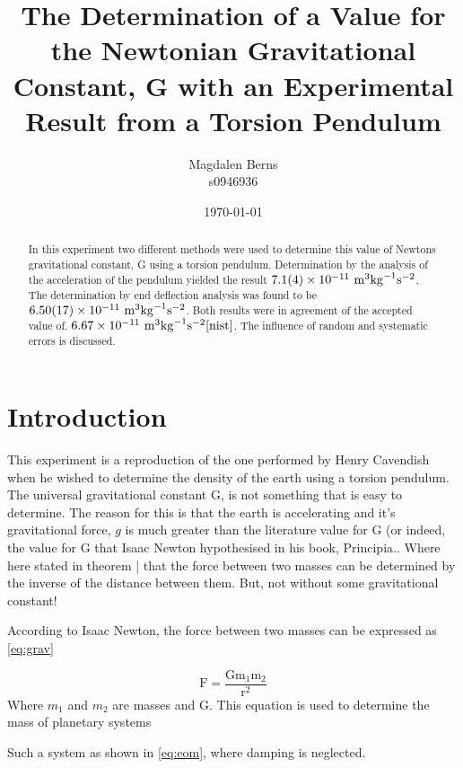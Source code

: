 \documentclass[12pt]{article}
\title{The Determination of a Value for the Newtonian Gravitational Constant, G with an Experimental Result from a Torsion Pendulum}
\author{Magdalen Berns
\\
s0946936 \\}
\date{\today}
\begin{document}
\maketitle
\thispagestyle{empty}

\begin{abstract}
\noindent
In this experiment two different methods were used to determine this value of Newtons gravitational constant, G using a torsion pendulum. Determination by the analysis of the acceleration of the pendulum yielded the result $7.1(4)\times{10^{-11}}{\rm \ m}^3 {\rm kg}^{-1} {\rm s}^{-2}$. The determination by end deflection analysis was found to be $6.50(17)\times{10^{-11}}{\rm \ m}^3 {\rm kg}^{-1} {\rm s}^{-2}$. Both  results were in agreement of the accepted value of. $6.67\times{10^{-11}}{\rm \ m}^3 {\rm kg}^{-1} {\rm s}^{-2}\cite{nist}$. The influence of random and systematic errors is discussed.

 \end{abstract}

\clearpage
\tableofcontents
\thispagestyle{empty}
\clearpage

\section{Introduction}

This experiment is a reproduction of the one performed by Henry Cavendish when he wished to determine the density of the earth using a torsion pendulum.\cite{density,densearth} The universal gravitational constant G, is not something that is easy to determine. The reason for this is that the earth is accelerating and it's gravitational force, $g$ is much greater than the literature value for G (or indeed, the value for G that Isaac Newton hypothesised in his book, Principia.\cite{newton}. Where here stated in theorem | that the force between two masses can be determined by the inverse of the distance between them. But, not without some gravitational constant! 

According to Isaac Newton, the force between two masses can be expressed as \cref{eq:grav}

\begin{equation}
\label{eq:grav}
\mathrm{F=\frac{G m_{1} m_{2}}{r^{2}}}
\end{equation}
\noindent 
Where $m_{1}$ and $m_{2}$ are masses and G. This equation is used to determine the mass of planetary systems 

\noindent 
Such a system as shown in \cref{eq:eom}, where damping is neglected.
\end{document}
